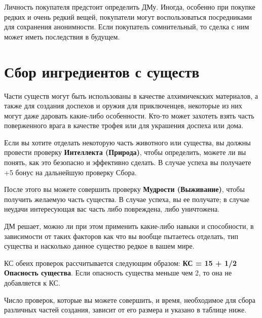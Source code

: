 \documentclass[a4paper, 9pt, twocolumn]{book}
\newenvironment {dndtable}
{
		\bigskip
		\centering
		\begin{tcolorbox}
			[enhanced, 
			sharp corners,
			colback=framecolor, 
			boxrule = 0pt, 
			overlay={
				\begin{tcbinvclipframe}
					\path[fill=black] ([xshift=10pt,yshift=7pt]frame.north west) --
					(frame.north west) --
					(frame.north east) --
					([xshift=-10pt, yshift=7pt]frame.north east) --
					([xshift=-10pt, yshift=2pt]frame.north east) --
					([xshift=10pt,yshift=2pt]frame.north west) -- cycle;
					
					\path[fill=black] ([xshift=10pt,yshift=-7pt]frame.south west) --
					(frame.south west) --
					(frame.south east) --
					([xshift=-10pt, yshift=-7pt]frame.south east) --
					([xshift=-10pt, yshift=-2pt]frame.south east) --
					([xshift=10pt,yshift=-2pt]frame.south west) -- cycle;
				\end{tcbinvclipframe}
			}
			]}
{\end{tcolorbox}}
\begin{document}
\begin{dndtable}
\begin{table}[H]
	\medspace
	
	\flushleft
	
	Личность покупателя предстоит определить ДМу. Иногда, особенно при покупке редких и очень редкий вещей, покупатели могут воспользоваться посредниками для сохранения анонимности. Если покупатель сомнительный, то сделка с ним может иметь последствия в будущем.
		
	\end{table}

\end{dndtable}
	
	
	\twocolumn
	\section{Сбор ингредиентов с существ}
	
	Части существ могут быть использованы в качестве алхимичекских материалов, а также для создания доспехов и оружия для приключенцев, некоторые из них могут даже даровать какие-либо особенности. Кто-то может захотеть взять часть поверженного врага в качестве трофея или для украшения доспеха или дома.
	
	Если вы хотите отделать некоторую часть животного или существа, вы должны провести проверку \textbf{Интеллекта (Природа)}, чтобы определить, можете ли вы понять, как это безопасно и эффективно сделать. В случае успеха вы получаете +5 бонус на дальнейшую проверку Сбора.
	
	После этого вы можете совершить проверку \textbf{Мудрости (Выживание)}, чтобы получить желаемую часть существа. В случае успеха, вы ее получате; в случае неудачи интересующая вас часть либо повреждена, либо уничтожена.
	
	ДМ решает, можно ли при этом применить какие-либо навыки и способности, в зависимости от таких факторов как что вы вообще пытаетесь отделать, тип существа и насколько данное существо редкое в вашем мире.
	
	КС обеих проверок рассчитывается следующим образом: \textbf{КС = 15 + 1/2 Опасность существа}. Если опасность существа меньше чем 2, то она не добавляется к КС.
	
	Число проверок, которые вы можете совершить, и время, необходимое для сбора различных частей создания, зависит от его размера и указано в таблице ниже.
	
\end{document}
